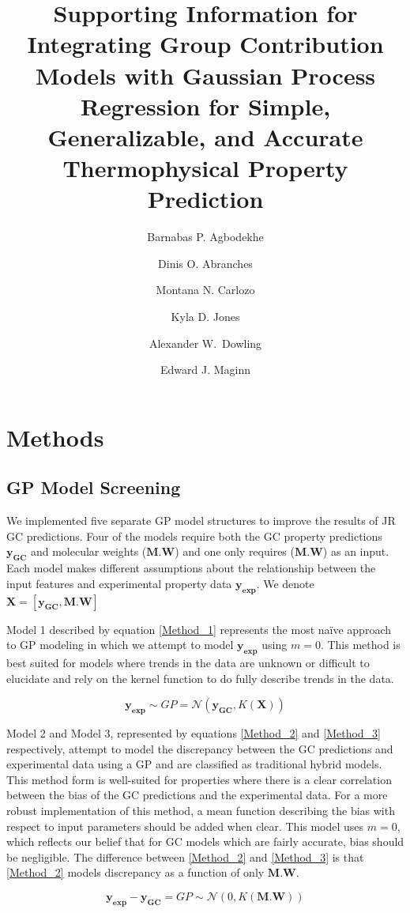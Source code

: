 \documentclass[journal=jacsat,manuscript=article]{achemso}
\author{Barnabas P. Agbodekhe}
\author{Dinis O. Abranches}
\author{Montana N. Carlozo}
\author{Kyla D. Jones}
\author{Alexander W.~Dowling}
\author{Edward J. Maginn}
\affiliation[University of Notre Dame]
{Department of Chemical and Biomolecular Engineering, University of Notre Dame, Notre Dame, IN 46556, USA}
\title{Supporting Information for \\ Integrating Group Contribution Models with Gaussian Process Regression for Simple, Generalizable, and Accurate Thermophysical Property Prediction}
\begin{document}
\newpage

\section{Methods}



\subsection{GP Model Screening}
We implemented five separate GP model structures to improve the results of JR GC predictions. Four of the models require both the GC property predictions $\mathbf{y_{GC}}$ and molecular weights ($\mathbf{M.W}$) and one only requires ($\mathbf{M.W}$) as an input. Each model makes different assumptions about the relationship between the input features and experimental property data $\mathbf{y_{\text{exp}}}$. We denote $\mathbf{X} = [\mathbf{y_{GC}}, \mathbf{M.W}]$

Model 1 described by equation \eqref{Method_1} represents the most na\"ive approach to GP modeling in which we attempt to model $\mathbf{y_{\text{exp}}}$ using $m=0$. This method is best suited for models where trends in the data are unknown or difficult to elucidate and rely on the kernel function to do fully describe trends in the data.

\begin{equation}
    \mathbf{y_{\text{exp}}} \sim  GP = \mathcal{N}\left(\mathbf{y_{GC}}, K(\mathbf{X}) \right)
    \label{Method_1}
\end{equation}

Model 2 and Model 3, represented by equations \eqref{Method_2} and \eqref{Method_3} respectively, attempt to model the discrepancy between the GC predictions and experimental data using a GP and are classified as traditional hybrid models. This method form is well-suited for properties where there is a clear correlation between the bias of the GC predictions and the experimental data. For a more robust implementation of this method, a mean function describing the bias with respect to input parameters should be added when clear. This model uses $m=0$, which reflects our belief that for GC models which are fairly accurate, bias should be negligible. The difference between \eqref{Method_2} and \eqref{Method_3} is that \eqref{Method_2} models discrepancy as a function of only $\mathbf{M.W}$.

\begin{equation}
    \mathbf{y_{\text{exp}}} - \mathbf{y_{GC}} = GP \sim \mathcal{N}\left(0, K(\mathbf{M.W}) \right)
    \label{Method_2}
\end{equation}
\end{document}
